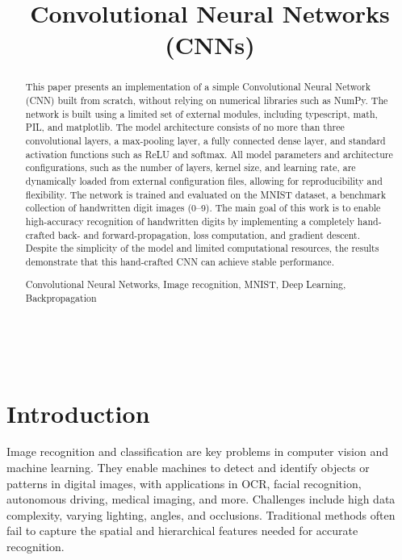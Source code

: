 \documentclass[conference]{IEEEtran}
\begin{document}
\title{Convolutional Neural Networks (CNNs)}\\

\author{
}

\maketitle
\thispagestyle{plain}
\pagestyle{plain}


\begin{abstract}
This paper presents an implementation of a simple Convolutional Neural Network (CNN) built from scratch, without relying on numerical libraries such as NumPy. The network is built using a limited set of external modules, including typescript, math, PIL, and matplotlib. The model architecture consists of no more than three convolutional layers, a max-pooling layer, a fully connected dense layer, and standard activation functions such as ReLU and softmax. All model parameters and architecture configurations, such as the number of layers, kernel size, and learning rate, are dynamically loaded from external configuration files, allowing for reproducibility and flexibility. The network is trained and evaluated on the MNIST dataset, a benchmark collection of handwritten digit images (0–9). The main goal of this work is to enable high-accuracy recognition of handwritten digits by implementing a completely hand-crafted back- and forward-propagation, loss computation, and gradient descent. Despite the simplicity of the model and limited computational resources, the results demonstrate that this hand-crafted CNN can achieve stable performance.

\begin{IEEEkeywords}
Convolutional Neural Networks, Image recognition, MNIST, Deep Learning, Backpropagation
\end{IEEEkeywords}

\end{abstract}

\section{Introduction}

Image recognition and classification are key problems in computer vision and machine learning. They enable machines to detect and identify objects or patterns in digital images, with applications in OCR, facial recognition, autonomous driving, medical imaging, and more. Challenges include high data complexity, varying lighting, angles, and occlusions. Traditional methods often fail to capture the spatial and hierarchical features needed for accurate recognition.
\end{document}
